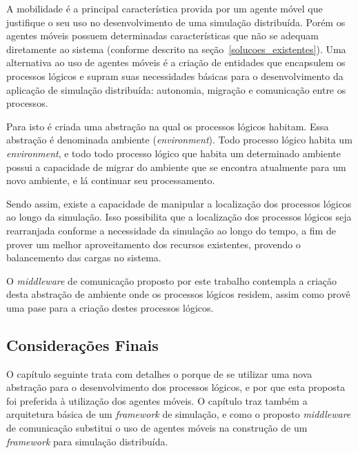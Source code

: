 A mobilidade é a principal característica provida por um agente móvel que justifique o seu uso no desenvolvimento de uma simulação distribuída. Porém os agentes móveis possuem determinadas características que não se adequam diretamente ao sistema (conforme descrito na seção~\ref{solucoes_existentes}). Uma alternativa ao uso de agentes móveis é a criação de entidades que encapsulem os processos lógicos e supram suas necessidades básicas para o desenvolvimento da aplicação de simulação distribuída: autonomia, migração e comunicação entre os processos.

Para isto é criada uma abstração na qual os processos lógicos habitam. Essa abstração é denominada ambiente (\textit{environment}). Todo processo lógico habita um \textit{environment}, e todo todo processo lógico que habita um determinado ambiente possui a capacidade de migrar do ambiente que se encontra atualmente para um novo ambiente, e lá continuar seu processamento.

Sendo assim, existe a capacidade de manipular a localização dos processos lógicos ao longo da simulação. Isso possibilita que a localização dos processos lógicos seja rearranjada conforme a necessidade da simulação ao longo do tempo, a fim de prover um melhor aproveitamento dos recursos existentes, provendo o balancemento das cargas no sistema.

O \textit{middleware} de comunicação proposto por este trabalho contempla a criação desta abstração de ambiente onde os processos lógicos residem, assim como provê uma pase para a criação destes processos lógicos.

\subsection{Considerações Finais}

O capítulo seguinte trata com detalhes o porque de se utilizar uma nova abstração para o desenvolvimento dos processos lógicos, e por que esta proposta foi preferida à utilização dos agentes móveis. O capítulo traz também a arquitetura básica de um \textit{framework} de simulação, e como o proposto \textit{middleware} de comunicação substitui o uso de agentes móveis na construção de um \textit{framework} para simulação distribuída.
